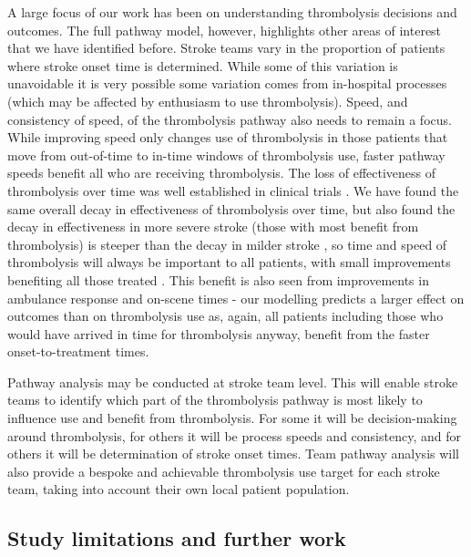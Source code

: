 A large focus of our work has been on understanding thrombolysis decisions and outcomes. The full pathway model, however, highlights other areas of interest that we have identified before. Stroke teams vary in the proportion of patients where stroke onset time is determined. While some of this variation is unavoidable it is very possible some variation comes from in-hospital processes (which may be affected by enthusiasm to use thrombolysis). Speed, and consistency of speed, of the thrombolysis pathway also needs to remain a focus. While improving speed only changes use of thrombolysis in those patients that move from out-of-time to in-time windows of thrombolysis use, faster pathway speeds benefit all who are receiving thrombolysis. The loss of effectiveness of thrombolysis over time was well established in clinical trials \cite{emberson_effect_2014}. We have found the same overall decay in effectiveness of thrombolysis over time, but also found the decay in effectiveness in more severe stroke (those with most benefit from thrombolysis) is steeper than the decay in milder stroke \cite{pearn_thrombolysis_2024}, so time and speed of thrombolysis will always be important to all patients, with small improvements benefiting all those treated \cite{meretoja_stroke_2014}. This benefit is also seen from improvements in ambulance response and on-scene times - our modelling predicts a larger effect on outcomes than on thrombolysis use as, again, all patients including those who would have arrived in time for thrombolysis anyway, benefit from the faster onset-to-treatment times. 

Pathway analysis may be conducted at stroke team level. This will enable stroke teams to identify which part of the thrombolysis pathway is most likely to influence use and benefit from thrombolysis. For some it will be decision-making around thrombolysis, for others it will be process speeds and consistency, and for others it will be determination of stroke onset times. Team pathway analysis will also provide a bespoke and achievable thrombolysis use target for each stroke team, taking into account their own local patient population.

\subsection{Study limitations and further work}

